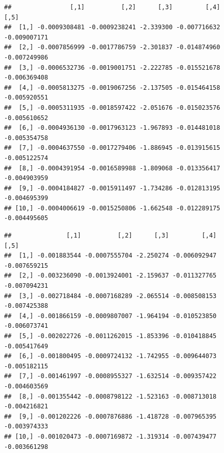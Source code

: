 \documentclass[12pt,a4paper]{article}
\newenvironment{Shaded}{\begin{snugshade}}{\end{snugshade}}
\newcommand{\CommentTok}[1]{\textcolor[rgb]{0.56,0.35,0.01}{\textit{#1}}}
\newcommand{\DataTypeTok}[1]{\textcolor[rgb]{0.13,0.29,0.53}{#1}}
\newcommand{\DecValTok}[1]{\textcolor[rgb]{0.00,0.00,0.81}{#1}}
\newcommand{\FloatTok}[1]{\textcolor[rgb]{0.00,0.00,0.81}{#1}}
\newcommand{\KeywordTok}[1]{\textcolor[rgb]{0.13,0.29,0.53}{\textbf{#1}}}
\newcommand{\NormalTok}[1]{#1}
\newcommand{\OperatorTok}[1]{\textcolor[rgb]{0.81,0.36,0.00}{\textbf{#1}}}
\newcommand{\OtherTok}[1]{\textcolor[rgb]{0.56,0.35,0.01}{#1}}
\newcommand{\StringTok}[1]{\textcolor[rgb]{0.31,0.60,0.02}{#1}}
\begin{document}
\begin{Shaded}
\end{Shaded}

\begin{verbatim}
##                [,1]          [,2]      [,3]         [,4]         [,5]
##  [1,] -0.0009308481 -0.0009238241 -2.339300 -0.007716632 -0.009007171
##  [2,] -0.0007856999 -0.0017786759 -2.301837 -0.014874960 -0.007249986
##  [3,] -0.0006532736 -0.0019001751 -2.222785 -0.015521678 -0.006369408
##  [4,] -0.0005813275 -0.0019067256 -2.137505 -0.015464158 -0.005920551
##  [5,] -0.0005311935 -0.0018597422 -2.051676 -0.015023576 -0.005610652
##  [6,] -0.0004936130 -0.0017963123 -1.967893 -0.014481018 -0.005354758
##  [7,] -0.0004637550 -0.0017279406 -1.886945 -0.013915615 -0.005122574
##  [8,] -0.0004391954 -0.0016589988 -1.809068 -0.013356417 -0.004903959
##  [9,] -0.0004184827 -0.0015911497 -1.734286 -0.012813195 -0.004695399
## [10,] -0.0004006619 -0.0015250806 -1.662548 -0.012289175 -0.004495605
\end{verbatim}

\begin{Shaded}
\end{Shaded}

\begin{verbatim}
##               [,1]          [,2]      [,3]         [,4]         [,5]
##  [1,] -0.001883544 -0.0007555704 -2.250274 -0.006092947 -0.007659215
##  [2,] -0.003236090 -0.0013924001 -2.159637 -0.011327765 -0.007094231
##  [3,] -0.002718484 -0.0007168289 -2.065514 -0.008508153 -0.007425388
##  [4,] -0.001866159 -0.0009807007 -1.964194 -0.010523850 -0.006073741
##  [5,] -0.002022726 -0.0011262015 -1.853396 -0.010418845 -0.005417649
##  [6,] -0.001800495 -0.0009724132 -1.742955 -0.009644073 -0.005182115
##  [7,] -0.001461997 -0.0008955327 -1.632514 -0.009357422 -0.004603569
##  [8,] -0.001355442 -0.0008798122 -1.523163 -0.008713018 -0.004216821
##  [9,] -0.001202226 -0.0007876886 -1.418728 -0.007965395 -0.003974333
## [10,] -0.001020473 -0.0007169872 -1.319314 -0.007439477 -0.003661298
\end{verbatim}
\end{document}
